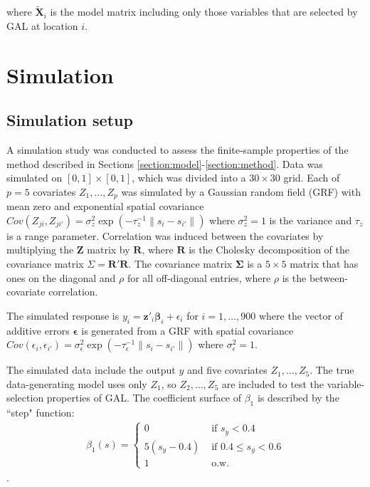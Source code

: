 \documentclass[authoryear, review, 11pt]{elsarticle}
\begin{document}
		where $\tilde{\bm{X}}_i$ is the model matrix including only those variables that are selected by GAL at location $i$.



\section{Simulation}
	\subsection{Simulation setup}
	A simulation study was conducted to assess the finite-sample properties of the method described in Sections \ref{section:model}-\ref{section:method}. Data was simulated on $[0,1] \times [0,1]$, which was divided into a $30 \times 30$ grid. Each of $p=5$ covariates $Z_1, \dots, Z_p$ was simulated by a Gaussian random field (GRF) with mean zero and exponential spatial covariance $Cov \left(Z_{ji}, Z_{ji'} \right) = \sigma_z^2 \exp{\left( -\tau_z^{-1} \|s_i - s_{i'} \| \right)}$ where $\sigma_z^2=1$ is the variance and $\tau_z$ is a range parameter. Correlation was induced between the covariates by multiplying the $\bm{Z}$ matrix by $\bm{R}$, where $\bm{R}$ is the Cholesky decomposition of the covariance matrix $\Sigma = \bm{R}'\bm{R}$. The covariance matrix $\bm{\Sigma}$ is a $5 \times 5$ matrix that has ones on the diagonal and $\rho$ for all off-diagonal entries, where $\rho$ is the between-covariate correlation.
		
	The simulated response is $y_i = \bm{z}'_i \bm{\beta}_i + \epsilon_i$ for $i=1, \dots, 900$ where the vector of additive errors $\bm{\epsilon}$ is generated from a GRF with spatial covariance $Cov \left(\epsilon_{i}, \epsilon_{i'} \right) = \sigma_{\epsilon}^2 \exp{\left( -\tau_{\epsilon}^{-1} \|s_i - s_{i'} \| \right)}$ where $\sigma_{\epsilon}^2=1$.
	
	The simulated data include the output $y$ and five covariates $Z_1, \dots, Z_5$. The true data-generating model uses only $Z_1$, so $Z_2, \dots, Z_5$ are included to test the variable-selection properties of GAL. The coefficient surface of $\beta_1$ is described by the ``step" function:
	\begin{eqnarray}
		\beta_1(s) = \begin{cases} 0 &\mbox{ if } s_y<0.4 \\ 5(s_y-0.4) &\mbox{ if } 0.4 \leq s_y<0.6 \\ 1 &\mbox{ o.w.} \end{cases}
	\end{eqnarray}.\\
		
\end{document}

